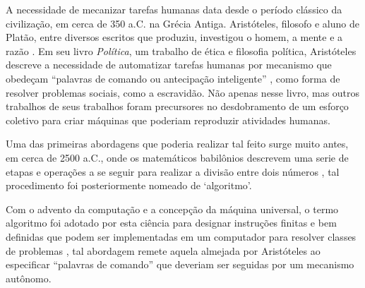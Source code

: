 \newcommand{\texCommand}[1]{\texttt{\textbackslash{#1}}}%

\newcommand{\exemplo}[1]{%
\vspace{\baselineskip}%
\noindent\fbox{\begin{minipage}{\textwidth}#1\end{minipage}}%
\\\vspace{\baselineskip}}%

\newcommand{\exemploVerbatim}[1]{%
\vspace{\baselineskip}%
\noindent\fbox{\begin{minipage}{\textwidth}%
#1\end{minipage}}%
\\\vspace{\baselineskip}}%

A necessidade de mecanizar tarefas humanas data desde o período clássico da civilização, em cerca de 350 a.C. na Grécia Antiga.
Aristóteles, filosofo e aluno de Platão, entre diversos escritos que produziu, investigou o homem, a mente e a razão \cite{russell2004history}. Em seu livro \textit{Política}, um trabalho de ética e filosofia política, Aristóteles descreve a necessidade de automatizar tarefas humanas por mecanismo que obedeçam ``palavras de comando ou antecipação inteligente'' \cite{2013aristotle}, como forma de resolver problemas sociais, como a escravidão. Não apenas nesse livro, mas outros trabalhos de seus trabalhos foram precursores \cite{russell2016artificial} no desdobramento de um esforço coletivo para criar máquinas que poderiam reproduzir atividades humanas.

Uma das primeiras abordagens que poderia realizar tal feito surge muito antes, em cerca de 2500 a.C., onde os matemáticos babilônios descrevem uma serie de etapas e operações a se seguir para realizar a divisão entre dois números \cite{chabert1999history}, tal procedimento foi posteriormente nomeado de `algoritmo'.

Com o advento da computação e a concepção da máquina universal, o termo algoritmo foi adotado por esta ciência para designar instruções finitas e bem definidas que podem ser implementadas em um computador para resolver classes de problemas \cite{britannica2006algorithm}, tal abordagem remete aquela almejada por Aristóteles ao especificar ``palavras de comando'' que deveriam ser seguidas por um mecanismo autônomo.

